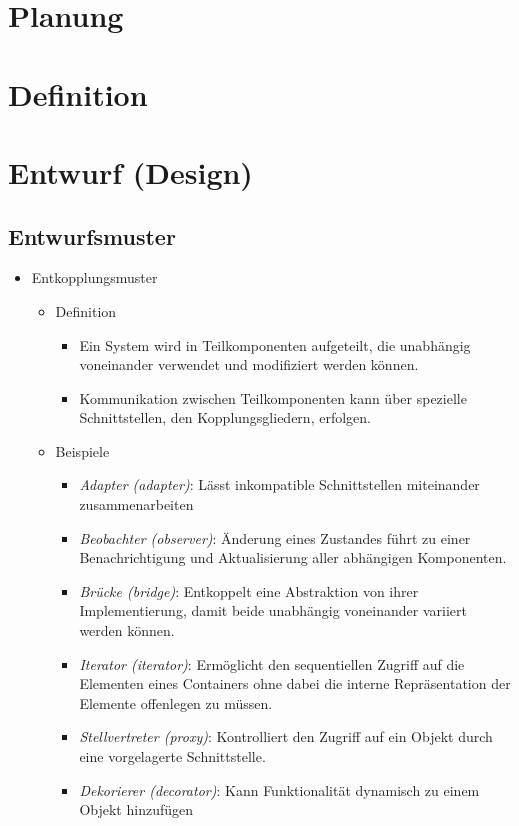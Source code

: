 \documentclass{article}
\begin{document}
\section{Planung}
\section{Definition}
\section{Entwurf (Design)}

\subsection{Entwurfsmuster}

\begin{itemize}
  \item Entkopplungsmuster
  \begin{itemize}
    \item Definition
    \begin{itemize}
      \item Ein System wird in Teilkomponenten aufgeteilt, die unabhängig voneinander verwendet und modifiziert werden können.
      \item Kommunikation zwischen Teilkomponenten kann über spezielle Schnittstellen, den Kopplungsgliedern, erfolgen.
    \end{itemize}
    \item Beispiele
    \begin{itemize}
      \item \textit{Adapter (adapter)}: Lässt inkompatible Schnittstellen miteinander zusammenarbeiten
      \item \textit{Beobachter (observer)}: Änderung eines Zustandes führt zu einer Benachrichtigung und Aktualisierung aller abhängigen Komponenten. 
      \item \textit{Brücke (bridge)}: Entkoppelt eine Abstraktion von ihrer Implementierung, damit beide unabhängig voneinander variiert werden können.
      \item \textit{Iterator (iterator)}: Ermöglicht den sequentiellen Zugriff auf die Elementen eines Containers ohne dabei die interne Repräsentation der Elemente offenlegen zu müssen.
      \item \textit{Stellvertreter (proxy)}: Kontrolliert den Zugriff auf ein Objekt durch eine vorgelagerte Schnittstelle.
      \item \textit{Dekorierer (decorator)}: Kann Funktionalität dynamisch zu einem Objekt hinzufügen

\end{itemize}
\end{itemize}
\end{itemize}
\end{document}
